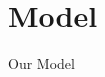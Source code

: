 \documentclass[aspectratio=1610]{beamer}
\begin{document}
\section[Model]{Model}



    {
\begin{frame}
\Huge \textcolor{uzhblue}{Our Model}
\end{frame}}

\end{document}
